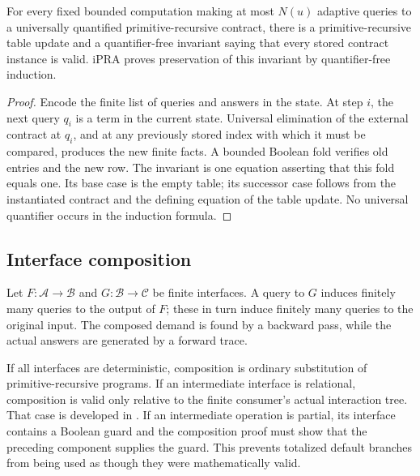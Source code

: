 \begin{lemma}
For every fixed bounded computation making at most \(N(u)\) adaptive queries to a universally quantified primitive-recursive contract, there is a primitive-recursive table update and a quantifier-free invariant saying that every stored contract instance is valid.  iPRA proves preservation of this invariant by quantifier-free induction.
\end{lemma}

\begin{proof}
Encode the finite list of queries and answers in the state.  At step \(i\), the next query \(q_i\) is a term in the current state.  Universal elimination of the external contract at \(q_i\), and at any previously stored index with which it must be compared, produces the new finite facts.  A bounded Boolean fold verifies old entries and the new row.  The invariant is one equation asserting that this fold equals one.  Its base case is the empty table; its successor case follows from the instantiated contract and the defining equation of the table update.  No universal quantifier occurs in the induction formula.
\end{proof}

\subsection{Interface composition}

Let \(F:\mathcal A\to\mathcal B\) and \(G:\mathcal B\to\mathcal C\) be finite interfaces.  A query to \(G\) induces finitely many queries to the output of \(F\); these in turn induce finitely many queries to the original input.  The composed demand is found by a backward pass, while the actual answers are generated by a forward trace.

If all interfaces are deterministic, composition is ordinary substitution of primitive-recursive programs.  If an intermediate interface is relational, composition is valid only relative to the finite consumer's actual interaction tree.  That case is developed in .  If an intermediate operation is partial, its interface contains a Boolean guard and the composition proof must show that the preceding component supplies the guard.  This prevents totalized default branches from being used as though they were mathematically valid.

